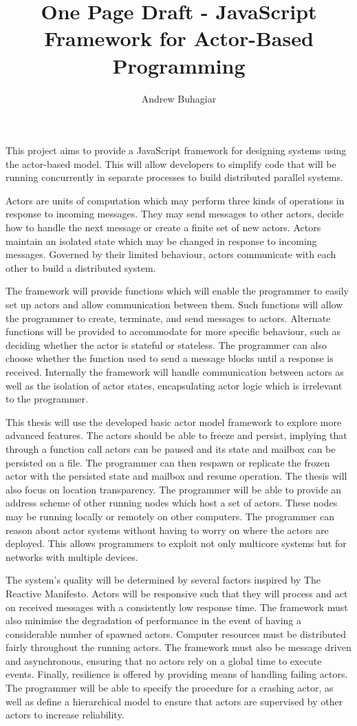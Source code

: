 \documentclass[12pt]{report}
\author{Andrew Buhagiar}
\title{One Page Draft - JavaScript Framework for Actor-Based Programming}
\begin{document}
\maketitle
This project aims to provide a JavaScript framework for designing systems using the actor-based model. This will allow developers to simplify code that will be running concurrently in separate processes to build distributed parallel systems.

Actors are units of computation which may perform three kinds of operations in response to incoming messages\cite{agha_1986}. They may send messages to other actors, decide how to handle the next message or create a finite set of new actors. Actors maintain an isolated state which may be changed in response to incoming messages. Governed by their limited behaviour, actors communicate with each other to build a distributed system.

The framework will provide functions which will enable the programmer to easily set up actors and allow communication between them. Such functions will allow the programmer to create, terminate, and send messages to actors. Alternate functions will be provided to accommodate for more specific behaviour, such as deciding whether the actor is stateful or stateless. The programmer can also choose whether the function used to send a message blocks until a response is received. Internally the framework will handle communication between actors as well as the isolation of actor states, encapsulating actor logic which is irrelevant to the programmer. 

This thesis will use the developed basic actor model framework to explore more advanced features. The actors should be able to freeze and persist, implying that through a function call actors can be paused and its state and mailbox can be persisted on a file. The programmer can then respawn or replicate the frozen actor with the persisted state and mailbox and resume operation. The thesis will also focus on location transparency. The programmer will be able to provide an address scheme of other running nodes which host a set of actors. These nodes may be running locally or remotely on other computers. The programmer can reason about actor systems without having to worry on where the actors are deployed. This allows programmers to exploit not only multicore systems but for networks with multiple devices.

The system’s quality will be determined by several factors inspired by The Reactive Manifesto\cite{reactivemanifesto}. Actors will be responsive such that they will process and act on received messages with a consistently low response time. The framework must also minimise the degradation of performance in the event of having a considerable number of spawned actors. Computer resources must be distributed fairly throughout the running actors. The framework must also be message driven and asynchronous, ensuring that no actors rely on a global time to execute events. Finally, resilience is offered by providing means of handling failing actors. The programmer will be able to specify the procedure for a crashing actor, as well as define a hierarchical model to ensure that actors are supervised by other actors to increase reliability.


\end{document}
